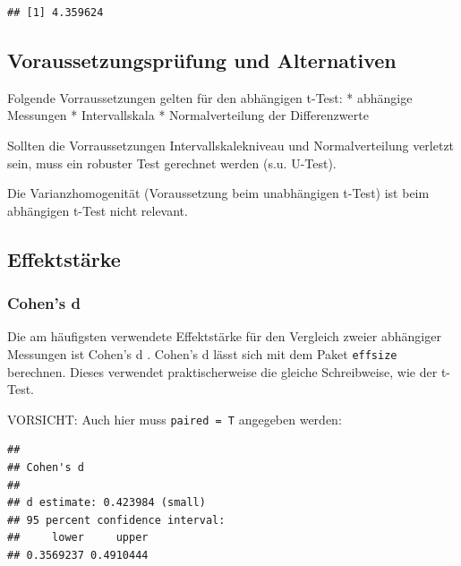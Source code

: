 \documentclass[
]{book}
\newenvironment{Shaded}{\begin{snugshade}}{\end{snugshade}}
\newcommand{\AttributeTok}[1]{\textcolor[rgb]{0.13,0.29,0.53}{#1}}
\newcommand{\FunctionTok}[1]{\textcolor[rgb]{0.13,0.29,0.53}{\textbf{#1}}}
\newcommand{\NormalTok}[1]{#1}
\newcommand{\SpecialCharTok}[1]{\textcolor[rgb]{0.81,0.36,0.00}{\textbf{#1}}}
\begin{document}
\begin{verbatim}
## [1] 4.359624
\end{verbatim}

\subsection{Voraussetzungsprüfung und Alternativen}\label{voraussetzungspruxfcfung-und-alternativen-1}

Folgende Vorraussetzungen gelten für den abhängigen t-Test:
* abhängige Messungen
* Intervallskala
* Normalverteilung der Differenzwerte

Sollten die Vorraussetzungen Intervallskalekniveau und Normalverteilung verletzt sein, muss ein robuster Test gerechnet werden (s.u. U-Test).

Die Varianzhomogenität (Voraussetzung beim unabhängigen t-Test) ist beim abhängigen t-Test nicht relevant.

\subsection{Effektstärke}\label{effektstuxe4rke-2}

\subsubsection{Cohen's d}\label{cohens-d-2}

Die am häufigsten verwendete Effektstärke für den Vergleich zweier abhängiger Messungen ist Cohen's d \citet{cohen1988statistical}.
Cohen's d lässt sich mit dem Paket \texttt{effsize} berechnen. Dieses verwendet praktischerweise die gleiche Schreibweise, wie der t-Test.

VORSICHT: Auch hier muss \texttt{paired\ =\ T} angegeben werden:

\begin{Shaded}
\end{Shaded}

\begin{verbatim}
## 
## Cohen's d
## 
## d estimate: 0.423984 (small)
## 95 percent confidence interval:
##     lower     upper 
## 0.3569237 0.4910444
\end{verbatim}
\end{document}

